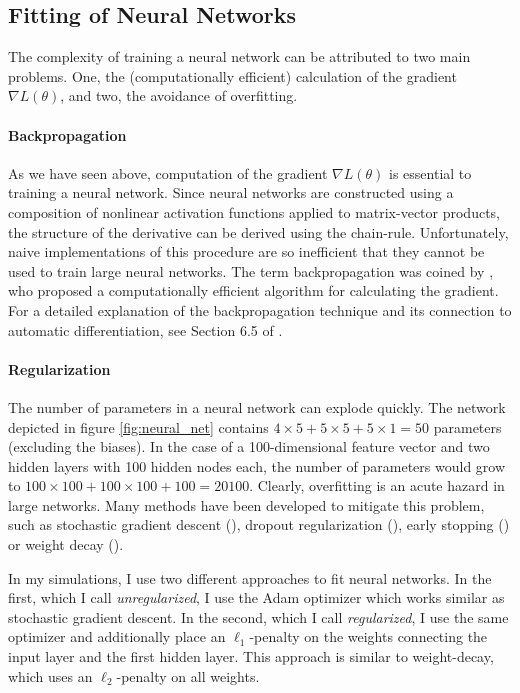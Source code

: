 \subsection{Fitting of Neural Networks}

The complexity of training a neural network can be attributed to two main problems. One,
the (computationally efficient) calculation of the gradient $\nabla L(\theta)$, and two,
the avoidance of overfitting.

\paragraph{Backpropagation}

As we have seen above, computation of the gradient $\nabla L(\theta)$ is essential to
training a neural network. Since neural networks are constructed using a composition of
nonlinear activation functions applied to matrix-vector products, the structure of the
derivative can be derived using the chain-rule. Unfortunately, naive implementations of
this procedure are so inefficient that they cannot be used to train large neural
networks. The term backpropagation was coined by \cite{Rumelhart.1986}, who proposed a
computationally efficient algorithm for calculating the gradient. For a detailed
explanation of the backpropagation technique and its connection to automatic
differentiation, see Section 6.5 of \cite{Goodfellow.2016}.

\paragraph{Regularization}

The number of parameters in a neural network can explode quickly. The network depicted
in figure \ref{fig:neural_net} contains $4 \times 5 + 5 \times 5 + 5 \times 1 = 50$
parameters (excluding the biases). In the case of a 100-dimensional feature vector and
two hidden layers with 100 hidden nodes each, the number of parameters would grow to
$100 \times 100 + 100 \times 100 + 100 = 20100$. Clearly, overfitting is an acute hazard
in large networks. Many methods have been developed to mitigate this problem, such as
stochastic gradient descent (\cite{Ruppert.1985}), dropout regularization
(\cite{Srivastava.2014}), early stopping (\cite{Caruana.2000}) or weight decay
(\cite{Krogh.1991}).

In my simulations, I use two different approaches to fit neural networks. In the first,
which I call \emph{unregularized}, I use the Adam optimizer which works similar as
stochastic gradient descent. In the second, which I call \emph{regularized}, I use the
same optimizer and additionally place an $\ell_1$-penalty on the weights connecting the
input layer and the first hidden layer. This approach is similar to weight-decay, which
uses an $\ell_2$-penalty on all weights.
